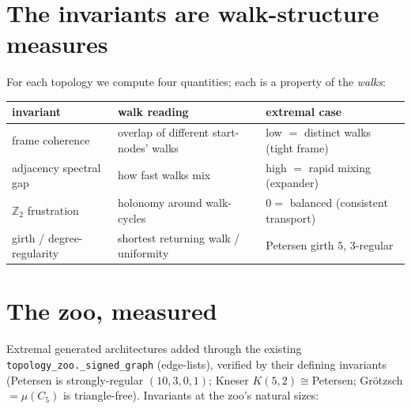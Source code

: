 \documentclass[11pt]{article}
\begin{document}
\section{The invariants are walk-structure measures}
For each topology we compute four quantities; each is a property of the \emph{walks}:
\begin{center}\small
\begin{tabular}{lll}
\toprule
invariant & walk reading & extremal case \\
\midrule
frame coherence & overlap of different start-nodes' walks & low $=$ distinct walks (tight frame) \\
adjacency spectral gap & how fast walks mix & high $=$ rapid mixing (expander) \\
$\mathbb{Z}_2$ frustration & holonomy around walk-cycles & $0=$ balanced (consistent transport) \\
girth / degree-regularity & shortest returning walk / uniformity & Petersen girth $5$, $3$-regular \\
\bottomrule
\end{tabular}
\end{center}

\section{The zoo, measured}
Extremal generated architectures added through the existing \texttt{topology\_zoo.\_signed\_graph} (edge-lists),
verified by their defining invariants (Petersen is strongly-regular $(10,3,0,1)$; Kneser $K(5,2)\!\cong\!$Petersen;
Grötzsch $=\mu(C_5)$ is triangle-free). Invariants at the zoo's natural sizes:
\end{document}
